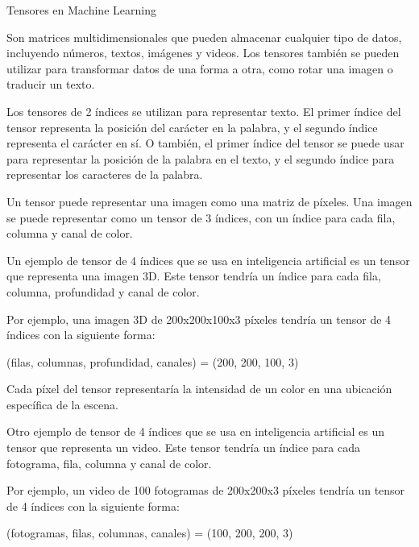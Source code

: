 \documentclass[10pd,hyperref={colorlinks=true}]{beamer}
\begin{document}

\begin{frame}{}

 \vfill
 \centerline{}
 \vfill

 \end{frame}


\begin{frame}{Tensores en Machine Learning}

 \vfill

Son matrices multidimensionales que pueden almacenar cualquier 
tipo de datos, incluyendo números, textos, imágenes y videos. Los 
tensores tambi\'en se pueden utilizar para transformar datos de 
una forma a otra, como rotar una imagen o traducir un texto.

Los tensores de 2 índices se utilizan para representar texto. El 
primer índice del tensor representa la posición del carácter en la 
palabra, y el segundo índice representa el carácter en sí. O 
también, el primer índice del tensor se puede usar para 
representar la posición de la palabra en el texto, y el segundo 
índice para representar los caracteres de la palabra.

Un tensor puede representar una imagen como una matriz de píxeles. 
Una imagen se puede representar como un tensor de 3 índices, con 
un índice para cada fila, columna y canal de color.

Un ejemplo de tensor de 4 índices que se usa en inteligencia 
artificial es un tensor que representa una imagen 3D. Este tensor 
tendría un índice para cada fila, columna, profundidad y canal de 
color.

 \vfill

 \end{frame}


\begin{frame}{}

 \vfill

Por ejemplo, una imagen 3D de 200x200x100x3 píxeles tendría un 
tensor de 4 índices con la siguiente forma:

(filas, columnas, profundidad, canales) = (200, 200, 100, 3)

Cada píxel del tensor representaría la intensidad de un color en 
una ubicación específica de la escena.

Otro ejemplo de tensor de 4 índices que se usa en inteligencia 
artificial es un tensor que representa un video. Este tensor 
tendría un índice para cada fotograma, fila, columna y canal de 
color.

Por ejemplo, un video de 100 fotogramas de 200x200x3 píxeles 
tendría un tensor de 4 índices con la siguiente forma:

(fotogramas, filas, columnas, canales) = (100, 200, 200, 3)

 \vfill

 \end{frame}
\end{document}
